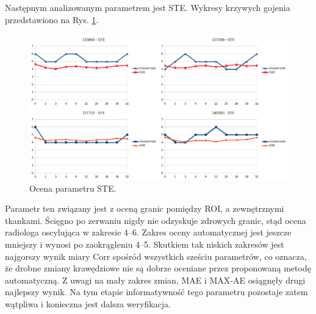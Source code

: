Następnym analizowanym parametrem jest STE. Wykresy krzywych gojenia przedstawiono na Rys. \ref{fig:STE}.
\begin{figure}[h!]
	\centering
	\includegraphics[width=1\textwidth]{figures/STE.png}
	\caption{Ocena parametru STE.}\label{fig:STE}
\end{figure}
Parametr ten związany jest z oceną granic pomiędzy ROI, a zewnętrznymi tkankami. Ścięgno po zerwaniu nigdy nie odzyskuje zdrowych granic, stąd ocena radiologa oscylująca w zakresie 4--6. Zakres oceny automatycznej jest jeszcze mniejszy i wynosi po zaokrągleniu 4--5. Skutkiem tak niskich zakresów jest najgorszy wynik miary Corr spośród wszystkich sześciu parametrów, co oznacza, że drobne zmiany krawędziowe nie są dobrze oceniane przez proponowaną metodę automatyczną. Z uwagi na mały zakres zmian, MAE i MAX-AE osiągnęły drugi najlepszy wynik. Na tym etapie informatywność tego parametru pozostaje zatem wątpliwa i konieczna jest dalsza weryfikacja.

